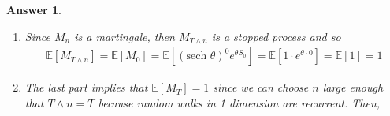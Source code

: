 \documentclass[12pt]{article}
\theoremstyle{colon}
\newtheorem*{answer}{Answer}
\begin{document}
\begin{answer}
\begin{enumerate}[label=\alph*)]
      Now for the last property of matingales,
      \begin{gather*}
        \mathbb{E}[M_{n+k} | \mathcal{F}_n] = \mathbb{E}[(\text{sech } \theta)^{n+k} e^{\theta S_{n+k}} | \mathcal{F}_n] \\
        = \mathbb{E}[(\text{sech } \theta)^{n+k} e^{\theta (X_1 + \mathellipsis + X_{n+k})} | \mathcal{F}_n]
      \end{gather*}
      Using the fact that the $X_i$ are i.i.d. again,
      \begin{gather*}
        = (\text{sech } \theta)^{n} \mathbb{E}[(\text{sech } \theta)^{k} e^{\theta X_1} \cdot \mathellipsis \cdot e^{\theta X_{n+k}} | \mathcal{F}_n]
      \end{gather*}
      Since we have that $X_1$ to $X_n$ are $\mathcal{F}_n$-measurable, we can take them out of the expectation,
      \begin{gather*}
        = (\text{sech } \theta)^{n} e^{\theta X_1} \cdot \mathellipsis \cdot e^{\theta X_n} \mathbb{E}[(\text{sech } \theta)^{k} e^{\theta X_{n+1}} \cdot \mathellipsis \cdot e^{\theta X_{n+k}} | \mathcal{F}_n] \\
        = M_n \cdot \mathbb{E}[(\text{sech } \theta)^{k} e^{\theta X_{n+1}} \cdot \mathellipsis \cdot e^{\theta X_{n+k}} | \mathcal{F}_n] \\
        = M_n \cdot (\text{sech } \theta)^{k} \mathbb{E}[e^{\theta X_{n+1}} | \mathcal{F}_n ] \cdot \mathellipsis \cdot \mathbb{E}[e^{\theta X_{n+k}} | \mathcal{F}_n ] \\
        = M_n \cdot (\text{sech } \theta)^{k} \cdot (\text{cosh } \theta)^{k} \\
        = M_n
      \end{gather*}
      Where we used that $\mathbb{E}[e^{\theta X_{n+1}} | \mathcal{F}_n] = \text{cosh } \theta$ since the $X_k$'s are i.i.d.
    \item Since $M_n$ is a martingale, then $M_{T \land n}$ is a stopped process and so
      \begin{gather*}
        \mathbb{E}[M_{T \land n}] = \mathbb{E}[M_0] = \mathbb{E}[(\text{sech } \theta)^0 e^{\theta S_0}] = \mathbb{E}[1 \cdot e^{\theta \cdot 0}] = \mathbb{E}[1] = 1
      \end{gather*}
    \item The last part implies that $\mathbb{E}[M_T] = 1$ since we can choose $n$ large enough that $T \land n = T$ because random walks in 1 dimension are recurrent. Then,
      \begin{gather*}

\end{gather*}
\end{enumerate}
\end{answer}
\end{document}
